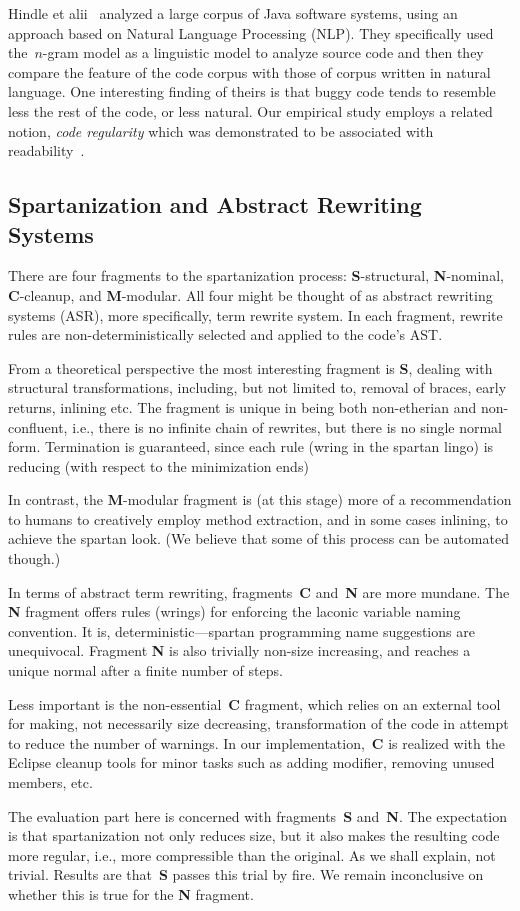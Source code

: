 Hindle et alii~\cite{Hindle:Bar:Su:Gabel:Devanbu:12} analyzed a large corpus of
Java software systems, using an approach based on Natural Language Processing
(NLP). They specifically used the~$n$-gram model as a linguistic model to
analyze source code and then they compare the feature of the code corpus with
those of corpus written in natural language. One interesting finding of theirs
is that buggy code tends to resemble less the rest of the code, or less
natural. Our empirical study employs a related notion, \emph{code regularity}
which was demonstrated to be associated with
readability~\cite{Jbara:Feitelson:14}.

\subsection{Spartanization and Abstract Rewriting Systems}

There are four fragments to the spartanization process: \textbf{S}-structural,
\textbf{N}-nominal, \textbf{C}-cleanup, and \textbf{M}-modular. All four might
be thought of as abstract rewriting systems (ASR), more specifically, term
rewrite system. In each fragment, rewrite rules are non-deterministically
selected and applied to the code's AST.

From a theoretical perspective the most interesting fragment is \textbf{S},
dealing with structural transformations, including, but not limited to, removal
of braces, early returns, inlining etc. The fragment is unique in being both
non-etherian and non-confluent, i.e., there is no infinite chain of rewrites,
but there is no single normal form. Termination is guaranteed, since each rule
(wring in the spartan lingo) is reducing (with respect to the minimization
ends)

In contrast, the \textbf{M}-modular fragment is (at this stage) more of a
recommendation to humans to creatively employ method extraction, and in some
cases inlining, to achieve the spartan look. (We believe that some of this
process can be automated though.)

In terms of abstract term rewriting, fragments~\textbf{C} and~\textbf{N} are
more mundane. The \textbf{N} fragment offers rules (wrings) for enforcing the
laconic variable naming convention. It is, deterministic---spartan programming
name suggestions are unequivocal. Fragment \textbf{N} is also trivially
non-size increasing, and reaches a unique normal after a finite number of
steps.

Less important is the non-essential~\textbf{C} fragment, which relies on an
external tool for making, not necessarily size decreasing, transformation of
the code in attempt to reduce the number of warnings. In our
implementation,~\textbf{C} is realized with the Eclipse cleanup tools for minor
tasks such as adding  modifier, removing unused members, etc.

The evaluation part here is concerned with fragments~\textbf{S} and~\textbf{N}.
The expectation is that spartanization not only reduces size, but it also makes
the resulting code more regular, i.e., more compressible than the original. As
we shall explain, not trivial. Results are that~\textbf{S} passes this trial by
fire. We remain inconclusive on whether this is true for the \textbf{N}
fragment.
